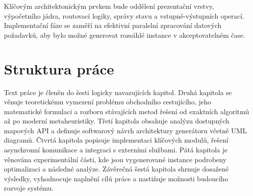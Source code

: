 Klíčovým architektonickým prvkem bude oddělení prezentační vrstvy, výpočetního jádra, routovací logiky, správy stavu a vstupně-výstupních operací. Implementační fáze se zaměří na efektivní paralelní zpracování datových požadavků, aby bylo možné generovat rozsáhlé instance v akceptovatelném čase.

\section{Struktura práce}

Text práce je členěn do šesti logicky navazujících kapitol. 
Druhá kapitola se věnuje teoretickému vymezení problému obchodního cestujícího, jeho matematické formulaci a rozboru stávajících metod řešení od exaktních algoritmů až po moderní metaheuristiky. 
Třetí kapitola obsahuje analýzu dostupných mapových API a definuje softwarový návrh architektury generátoru včetně UML diagramů. 
Čtvrtá kapitola popisuje implementaci klíčových modulů, řešení asynchronní komunikace a integraci s externími službami. 
Pátá kapitola je věnována experimentální části, kde jsou vygenerované instance podrobeny optimalizaci a následné analýze. 
Závěrečná šestá kapitola shrnuje dosažené výsledky, vyhodnocuje naplnění cílů práce a nastiňuje možnosti budoucího rozvoje systému.